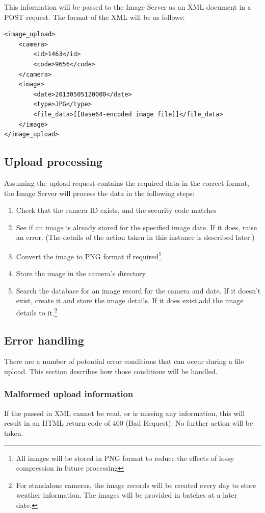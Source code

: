 \documentclass[11pt]{article}
\begin{document}
This information will be passed to the Image Server as an XML document in a POST request. The format of the XML will be as follows:

\begin{verbatim}
<image_upload>
    <camera>
        <id>1463</id>
        <code>9656</code>
    </camera>
    <image>
        <date>20130505120000</date>
        <type>JPG</type>
        <file_data>[[Base64-encoded image file]]</file_data>
    </image>
</image_upload>
\end{verbatim}

\subsection{Upload processing}
Assuming the upload request contains the required data in the correct format, the Image Server will process the data in the following steps:

\begin{enumerate}
\item Check that the camera ID exists, and the security code matches
\item See if an image is already stored for the specified image date. If it does, raise an error. (The details of the action taken in this instance is described later.)
\item Convert the image to PNG format if required\footnote{All images will be stored in PNG format to reduce the effects of lossy compression in future processing}
\item Store the image in the camera's directory
\item Search the database for an image record for the camera and date. If it doesn't exist, create it and store the image details. If it does exist,add the image details to it.\footnote{For standalone cameras, the image records will be created every day to store weather information. The images will be provided in batches at a later date.}
\end{enumerate}

\subsection{Error handling}
There are a number of potential error conditions that can occur during a file upload. This section describes how those conditions will be handled.

\subsubsection{Malformed upload information}
If the passed in XML cannot be read, or is missing any information, this will result in an HTML return code of 400 (Bad Request). No further action will be taken.
\end{document}
